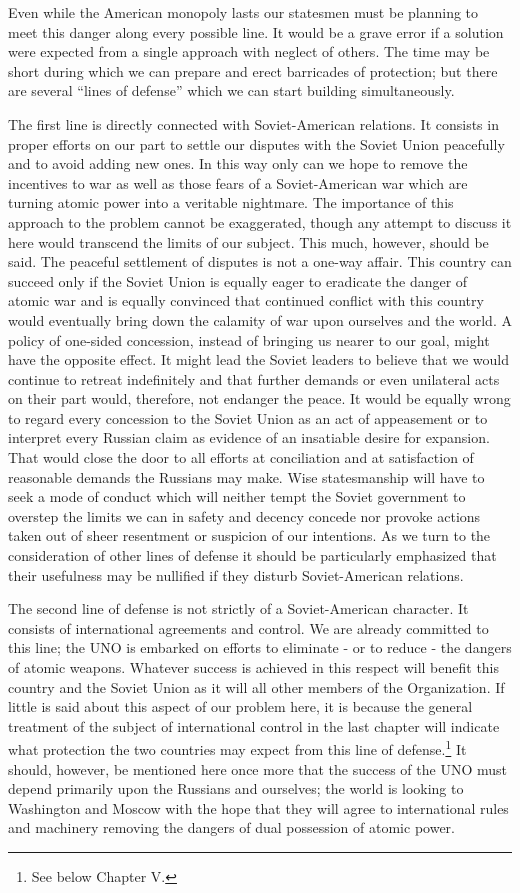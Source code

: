 Even while the American monopoly lasts our statesmen must be planning to meet this danger along every possible line. It would be a grave error if a solution were expected from a single approach with neglect of others. The time may be short during which we can prepare and erect barricades of protection; but there are several ``lines of defense'' which we can start building simultaneously.

The first line is directly connected with Soviet-American relations. It consists in proper efforts on our part to settle our disputes with the Soviet Union peacefully and to avoid adding new ones. In this way only can we hope to remove the incentives to war as well as those fears of a Soviet-American war which are turning atomic power into a veritable nightmare. The importance of this approach to the problem cannot be exaggerated, though any attempt to discuss it here would transcend the limits of our subject. This much, however, should be said. The peaceful settlement of disputes is not a one-way affair. This country
can succeed only if the Soviet Union is equally eager to eradicate the danger of atomic war and is equally convinced that continued conflict with this country would eventually bring down the calamity of war upon ourselves and the world. A policy of one-sided concession, instead of bringing us nearer to our goal, might have the opposite effect. It might lead the Soviet leaders to believe that we would continue to retreat indefinitely and that further demands or even unilateral acts on their part would, therefore, not endanger the peace. It would be equally wrong to regard every concession to the Soviet Union as an act of appeasement or to interpret every Russian claim as evidence of an insatiable desire for expansion. That would close the door to all efforts at conciliation and at satisfaction of reasonable demands the Russians may make. Wise statesmanship will have to seek a mode of conduct which will neither tempt the Soviet government to overstep the limits we can in safety and decency concede nor provoke actions taken out of sheer resentment or suspicion of our intentions. As we turn to the consideration of other lines of defense it should be particularly emphasized that their usefulness may be nullified if they disturb Soviet-American relations.

The second line of defense is not strictly of a Soviet-American character. It consists of international agreements and control. We are already committed to this line; the UNO is embarked on efforts to eliminate - or to reduce - the dangers of atomic weapons. Whatever success is achieved in this respect will benefit this country and the Soviet Union as it will all other members of the Organization. If little is said about this aspect of our problem here, it is because the general treatment of the subject of international control in the last chapter will indicate what protection the two countries may expect from this line of defense.\footnote{See below Chapter V.} It should, however, be mentioned here once more that the success of the UNO must depend primarily upon the Russians and ourselves; the world is looking to Washington and Moscow with the hope that they will agree to international rules and machinery removing the dangers of dual possession of atomic power.

